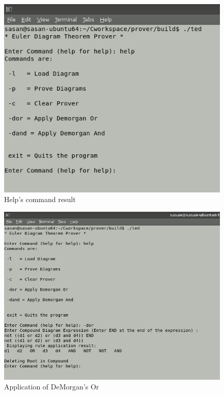 \documentclass[10pt, a4paper, titlepage]{article}
\begin{document}
\begin{figure}[]
\centering
\includegraphics[scale=0.5]{images/ted.png}
\caption{Help's command result}
\label{fig:ted}
\end{figure}


\begin{figure}[]
\centering
\includegraphics[scale=0.5]{images/dor.png}
\caption{Application of DeMorgan's Or}
\label{fig:dor}
\end{figure}
\end{document}
